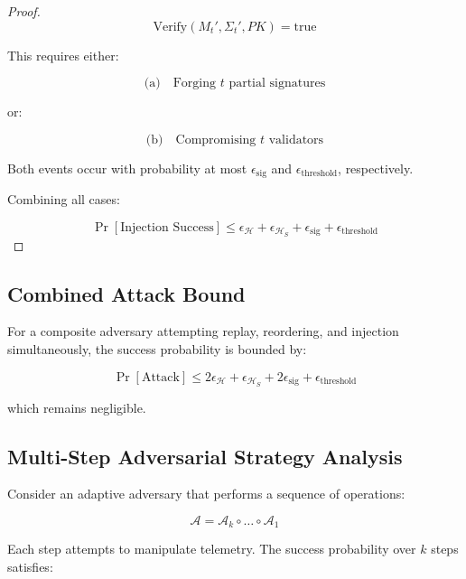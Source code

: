\begin{proof}
\begin{equation}
\text{Verify}(M_t', \Sigma_t', PK) = \text{true}
\end{equation}

This requires either:

\begin{equation}
\text{(a)} \quad \text{Forging } t \text{ partial signatures}
\end{equation}

or:

\begin{equation}
\text{(b)} \quad \text{Compromising } t \text{ validators}
\end{equation}

Both events occur with probability at most $\epsilon_{\text{sig}}$ and $\epsilon_{\text{threshold}}$, respectively.

Combining all cases:

\[
\Pr[\text{Injection Success}] \leq \epsilon_{\mathcal{H}} + \epsilon_{\mathcal{H}_S} + \epsilon_{\text{sig}} + \epsilon_{\text{threshold}}
\]
\end{proof}

\subsection{Combined Attack Bound}

For a composite adversary attempting replay, reordering, and injection simultaneously, the success probability is bounded by:

\begin{equation}
\Pr[\text{Attack}] \leq 2\epsilon_{\mathcal{H}} + \epsilon_{\mathcal{H}_S} + 2\epsilon_{\text{sig}} + \epsilon_{\text{threshold}}
\end{equation}

which remains negligible.

\subsection{Multi-Step Adversarial Strategy Analysis}

Consider an adaptive adversary that performs a sequence of operations:

\begin{equation}
\mathcal{A} = \mathcal{A}_k \circ \dots \circ \mathcal{A}_1
\end{equation}

Each step attempts to manipulate telemetry. The success probability over $k$ steps satisfies:

